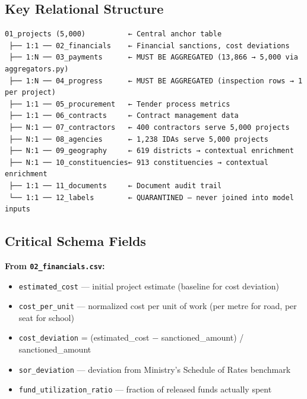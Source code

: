 \documentclass[11pt,a4paper]{article}
\begin{document}
\subsection{Key Relational Structure}

\begin{tcolorbox}[colback=gray!5!white,colframe=gray!60!black,arc=1mm,boxrule=0.6pt,left=6pt,right=6pt,top=6pt,bottom=6pt]
\begin{lstlisting}[basicstyle=\ttfamily\scriptsize,breaklines=true,columns=flexible]
01_projects (5,000)          ← Central anchor table
 ├── 1:1 ── 02_financials    ← Financial sanctions, cost deviations
 ├── 1:N ── 03_payments      ← MUST BE AGGREGATED (13,866 → 5,000 via aggregators.py)
 ├── 1:N ── 04_progress      ← MUST BE AGGREGATED (inspection rows → 1 per project)
 ├── 1:1 ── 05_procurement   ← Tender process metrics
 ├── 1:1 ── 06_contracts     ← Contract management data
 ├── N:1 ── 07_contractors   ← 400 contractors serve 5,000 projects
 ├── N:1 ── 08_agencies      ← 1,238 IDAs serve 5,000 projects
 ├── N:1 ── 09_geography     ← 619 districts → contextual enrichment
 ├── N:1 ── 10_constituencies← 913 constituencies → contextual enrichment
 ├── 1:1 ── 11_documents     ← Document audit trail
 └── 1:1 ── 12_labels        ← QUARANTINED — never joined into model inputs
\end{lstlisting}
\end{tcolorbox}


\subsection{Critical Schema Fields}

\textbf{From \texttt{02\_financials.csv}:}
\begin{itemize}[leftmargin=1.5em, itemsep=2pt, topsep=3pt]
\item \texttt{estimated\_cost} --- initial project estimate (baseline for cost deviation)
\item \texttt{cost\_per\_unit} --- normalized cost per unit of work (per metre for road, per seat for school)
\item \texttt{cost\_deviation} = (estimated\_cost − sanctioned\_amount) / sanctioned\_amount
\item \texttt{sor\_deviation} --- deviation from Ministry's Schedule of Rates benchmark
\item \texttt{fund\_utilization\_ratio} --- fraction of released funds actually spent
\end{itemize}
\end{document}

